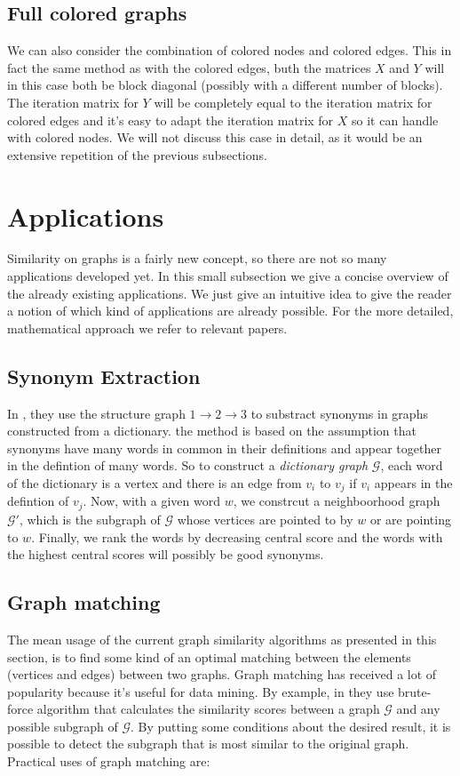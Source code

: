 \documentclass[a4paper,11pt]{report}
\newcommand{\graf}{\mathscr{G}}
\begin{document}
\subsection{Full colored graphs}
We can also consider the combination of colored nodes and colored edges. This in 
fact the same method as with the colored edges, buth the matrices $X$ and $Y$ 
will in this case both be block diagonal (possibly with a different number of 
blocks). The iteration matrix for $Y$ will be completely equal to the iteration 
matrix for colored edges and it's easy to adapt the iteration matrix for $X$ so it can handle with colored nodes. 
We will not discuss this case in detail, as it would 
be an extensive repetition of the previous subsections.
\newpage
\section{Applications}
Similarity on graphs is a fairly new concept, so there are not so many 
applications developed yet. In this small subsection we give a concise overview 
of the already existing applications. We just give an intuitive idea to give the 
reader a notion of which kind of applications are already possible. For the more 
detailed, mathematical approach we refer to relevant papers.
\subsection{Synonym Extraction}
In \cite{blondel}, they use the structure graph $1 \to 2 \to 3$ to substract 
synonyms in graphs constructed from a dictionary. the method is based on the 
assumption that synonyms have many words in common in their definitions and 
appear together in the defintion of many words. So to construct a \emph{dictionary 
graph} $\graf$, each word of the dictionary is a vertex 
and there is an edge from $v_i$ to $v_j$ if $v_i$ appears in the defintion of 
$v_j$. Now, with a given word $w$, we constrcut a neighboorhood graph $\graf'$, 
which is the subgraph of $\graf$ whose vertices are pointed to by $w$ or are 
pointing to $w$. Finally, we rank the words by decreasing central score and the 
words with the highest central scores will possibly be good synonyms.
\subsection{Graph matching}
The mean usage of the current graph similarity algorithms as presented in this 
section, is to find some kind of an optimal matching between the elements (vertices and edges) 
between two graphs. Graph matching has received a lot of popularity because it's 
useful for data mining. By example, in \cite{zager} they use brute-force 
algorithm that calculates the similarity scores between a graph $\graf$ and any 
possible subgraph of $\graf$. By putting some conditions about the desired 
result, it is possible to detect the subgraph that is most similar to the 
original graph. Practical uses of graph matching are:
\end{document}
